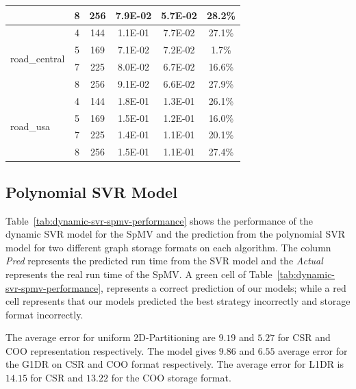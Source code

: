 \documentclass[conference, 10ppt]{IEEEtran}
\begin{document}
\begin{table}[htb]
\begin{tabular}[c]{| l | c | c | c | c | c |}
  &  8  &  256  &  7.9E-02  &  5.7E-02  &  28.2\% \\ \hline
\multirow{4}{*}{road\_central}  &  4  &  144  &  1.1E-01  &  7.7E-02  &  27.1\% \\ \cline{2-6}
  &  5  &  169  &  7.1E-02  &  7.2E-02  &  1.7\% \\ \cline{2-6}
  &  7  &  225  &  8.0E-02  &  6.7E-02  &  16.6\% \\ \cline{2-6}
  &  8  &  256  &  9.1E-02  &  6.6E-02  &  27.9\% \\ \hline
\multirow{4}{*}{road\_usa}  &  4  &  144  &  1.8E-01  &  1.3E-01  &  26.1\% \\ \cline{2-6}
  &  5  &  169  &  1.5E-01  &  1.2E-01  &  16.0\% \\ \cline{2-6}
  &  7  &  225  &  1.4E-01  &  1.1E-01  &  20.1\% \\ \cline{2-6}
  &  8  &  256  &  1.5E-01  &  1.1E-01  &  27.4\% \\ \hline
\end{tabular}
\end{table}

\subsection{Polynomial SVR Model}
Table~\ref{tab:dynamic-svr-spmv-performance} shows the performance of the dynamic SVR model for the SpMV 
and the prediction from the polynomial SVR model for two different
graph storage formats on each algorithm. The column \textit{Pred}
represents the predicted run time from the SVR model and the
\textit{Actual} represents the real run time of the SpMV. A green cell of  
Table~\ref{tab:dynamic-svr-spmv-performance}, represents a correct prediction of our
models; while a red cell represents that our models predicted the best
strategy incorrectly and storage format incorrectly. 

The average error for uniform 2D-Partitioning are $9.19$ and $5.27$ for
CSR and COO representation respectively.  The model gives $9.86$ and
$6.55$ average error for the G1DR on CSR and COO format
respectively. The average error for L1DR is $14.15$ for CSR and $13.22$
for the COO storage format.
\end{document}
